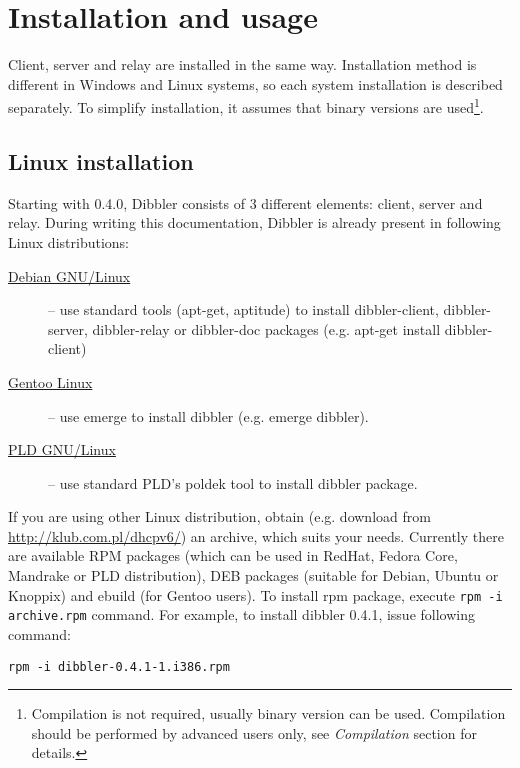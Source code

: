 
\newpage
\section{Installation and usage}
Client, server and relay are installed in the same way. Installation
method is different in Windows and Linux systems, so each system
installation is described separately. To simplify installation, it
assumes that binary versions are used\footnote{Compilation is not
required, usually binary version can be used. Compilation should be
performed by advanced users only, see \emph{Compilation} section for
details.}.

\subsection{Linux installation}
Starting with 0.4.0, Dibbler consists of 3 different elements: client,
server and relay. During writing this documentation, Dibbler is already
present in following Linux distributions:
\begin{description}
 \item[\href{http://debian.org}{Debian GNU/Linux}] -- use standard tools
 (apt-get, aptitude) to install dibbler-client, dibbler-server,
 dibbler-relay or dibbler-doc packages (e.g. apt-get install dibbler-client)
 \item[\href{http://www.gentoo.org}{Gentoo Linux}] -- use emerge to
 install dibbler (e.g. emerge dibbler).
 \item[\href{http://www.pld-linux.org}{PLD GNU/Linux}] -- use standard
  PLD's poldek tool to install dibbler package.
\end{description}

If you are using other Linux distribution, obtain (e.g. download from
\url{http://klub.com.pl/dhcpv6/}) an archive, which suits your
needs. Currently there are available RPM packages
(which can be used in RedHat, Fedora Core, Mandrake or PLD
distribution), DEB packages (suitable for Debian, Ubuntu or Knoppix) and
ebuild (for Gentoo users). To install rpm package, execute
\verb+rpm -i archive.rpm+ command. For example, to install dibbler 0.4.1,
issue following command:

\begin{verbatim}
rpm -i dibbler-0.4.1-1.i386.rpm
\end{verbatim}

